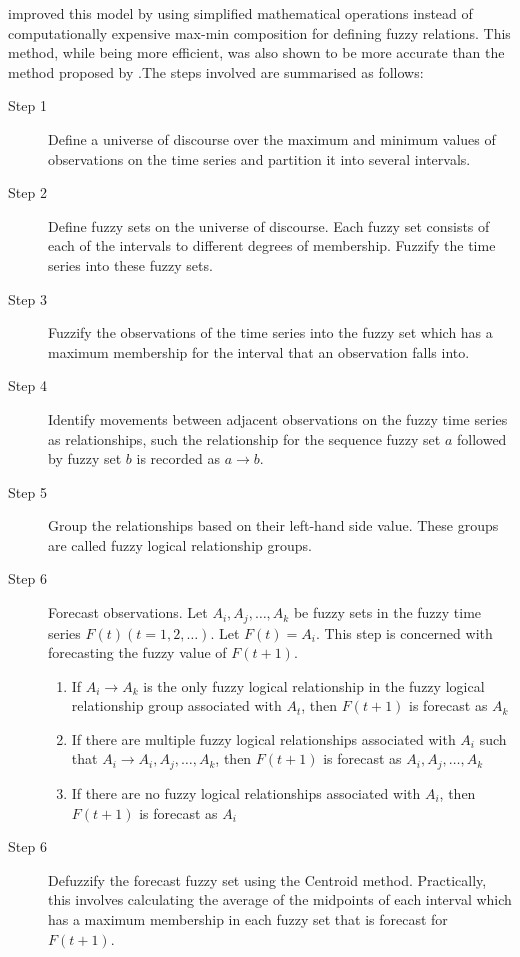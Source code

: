 \documentclass[12pt, oneside, a4paper]{article}
\theoremstyle{definition}
\begin{document}
\cite{chen1996forecasting} improved this model by using simplified mathematical operations instead of computationally expensive max-min composition for defining fuzzy relations. This method, while being more efficient, was also shown to be more accurate than the method proposed by \cite{song1993forecasting}.The steps involved are summarised as follows:

\begin{description}
\item[Step 1] Define a universe of discourse over the maximum and minimum values of observations on the time series and partition it into several intervals.
\item[Step 2] Define fuzzy sets on the universe of discourse. Each fuzzy set consists of each of the intervals to different degrees of membership. Fuzzify the time series into these fuzzy sets.
\item[Step 3] Fuzzify the observations of the time series into the fuzzy set which has a maximum membership for the interval that an observation falls into.
\item[Step 4] Identify movements between adjacent observations on the fuzzy time series as relationships, such the relationship for the sequence fuzzy set $a$ followed by fuzzy set $b$ is recorded as $a \rightarrow b$.
\item[Step 5] Group the relationships based on their left-hand side value. These groups are called fuzzy logical relationship groups.
\item[Step 6] Forecast observations. Let $A_{i}, A_{j}, \ldots, A_{k}$ be fuzzy sets in the fuzzy time series $F(t)(t=1,2,\ldots)$. Let $F(t) = A_{i}$. This step is concerned with forecasting the fuzzy value of $F(t+1)$.
\begin{enumerate}
\item If  $A_i \rightarrow A_k$ is the only fuzzy logical relationship in the fuzzy logical relationship group associated with $A_t$, then $F(t+1)$ is forecast as $A_k$ 
\item If there are multiple fuzzy logical relationships associated with $A_i$ such that $A_i \rightarrow A_{i}, A_{j}, \ldots, A_{k}$, then $F(t+1)$ is forecast as $A_{i}, A_{j}, \ldots, A_{k}$
\item If there are no fuzzy logical relationships associated with $A_i$, then $F(t+1)$ is forecast as $A_i$
\end{enumerate}
\item[Step 6] Defuzzify the forecast fuzzy set using the Centroid method. Practically, this involves calculating the average of the midpoints of each interval which has a maximum membership in each fuzzy set that is forecast for $F(t+1)$.
\end{description}
\end{document}
